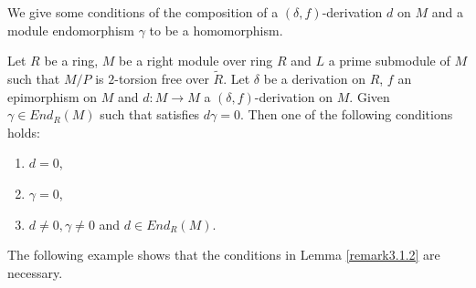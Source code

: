 \documentclass{arxiv}
\begin{document}
We give some conditions of the composition of a $(\delta,f)$-derivation $d$ on $M$ and a module endomorphism $\gamma$ to be a homomorphism.

\begin{lemma} \label{remark3.1.2}
   Let $R$ be a ring, $M$ be a right module over ring $R$ and $L$ a prime submodule of $M$ such that $M/P$ is $2$-torsion free over $\tilde{R}$. Let  $\delta$ be a derivation on $R$, $f$ an epimorphism on $M$  and  $d:M \rightarrow M$ a $(\delta,f)$-derivation on $M$. Given $\gamma \in End_R(M)$ such that satisfies $d\gamma=0$. Then one of the following conditions holds:
    \begin{enumerate}
        \item $d=0$,
        \item $\gamma = 0$,
        \item $d\ne 0, \gamma \ne 0$ and $d \in End_R(M)$.
    \end{enumerate} 
\end{lemma}
    
The following example shows that the conditions in Lemma \ref{remark3.1.2} are necessary.
\end{document}
